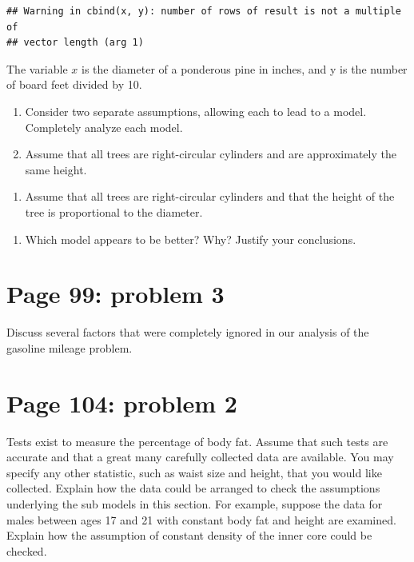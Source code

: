 \documentclass[]{article}
\newenvironment{Shaded}{\begin{snugshade}}{\end{snugshade}}
\newcommand{\KeywordTok}[1]{\textcolor[rgb]{0.13,0.29,0.53}{\textbf{{#1}}}}
\newcommand{\DecValTok}[1]{\textcolor[rgb]{0.00,0.00,0.81}{{#1}}}
\newcommand{\StringTok}[1]{\textcolor[rgb]{0.31,0.60,0.02}{{#1}}}
\newcommand{\NormalTok}[1]{{#1}}
\providecommand{\tightlist}{%
  \setlength{\itemsep}{0pt}\setlength{\parskip}{0pt}}
\begin{document}
\begin{verbatim}
## Warning in cbind(x, y): number of rows of result is not a multiple of
## vector length (arg 1)
\end{verbatim}

The variable \(x\) is the diameter of a ponderous pine in inches, and y
is the number of board feet divided by 10.

\begin{enumerate}
\def\labelenumi{\alph{enumi}.}
\item
  Consider two separate assumptions, allowing each to lead to a model.
  Completely analyze each model.
\item
  Assume that all trees are right-circular cylinders and are
  approximately the same height.
\end{enumerate}

\begin{Shaded}
\end{Shaded}

\begin{enumerate}
\def\labelenumi{\roman{enumi}.}
\setcounter{enumi}{1}
\tightlist
\item
  Assume that all trees are right-circular cylinders and that the height
  of the tree is proportional to the diameter.
\end{enumerate}

\begin{enumerate}
\def\labelenumi{\alph{enumi}.}
\setcounter{enumi}{1}
\tightlist
\item
  Which model appears to be better? Why? Justify your conclusions.
\end{enumerate}

\section{Page 99: problem 3}\label{page-99-problem-3}

Discuss several factors that were completely ignored in our analysis of
the gasoline mileage problem.

\section{Page 104: problem 2}\label{page-104-problem-2}

Tests exist to measure the percentage of body fat. Assume that such
tests are accurate and that a great many carefully collected data are
available. You may specify any other statistic, such as waist size and
height, that you would like collected. Explain how the data could be
arranged to check the assumptions underlying the sub models in this
section. For example, suppose the data for males between ages 17 and 21
with constant body fat and height are examined. Explain how the
assumption of constant density of the inner core could be checked.
\end{document}
